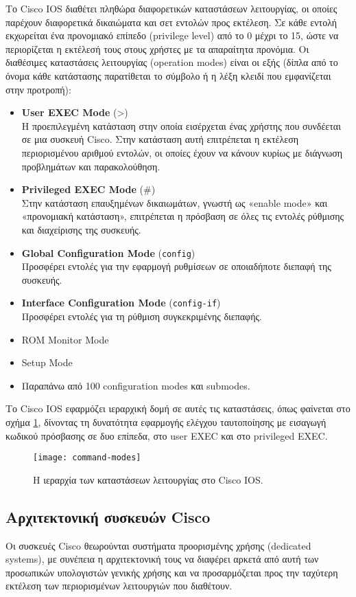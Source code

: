 \documentclass{EdipyLabs} %
\begin{document}
Το Cisco IOS διαθέτει πληθώρα διαφορετικών καταστάσεων λειτουργίας, οι οποίες παρέχουν διαφορετικά δικαιώματα και σετ εντολών προς εκτέλεση. Σε κάθε εντολή εκχωρείται ένα προνομιακό επίπεδο (privilege level) από το 0 μέχρι το 15, ώστε να περιορίζεται η εκτέλεσή τους στους χρήστες με τα απαραίτητα προνόμια. Οι διαθέσιμες καταστάσεις λειτουργίας (operation modes) είναι οι εξής (δίπλα από το όνομα κάθε κατάστασης παρατίθεται το σύμβολο ή η λέξη κλειδί που εμφανίζεται στην προτροπή):
\begin{itemize}
	\item \textbf{User EXEC Mode} (>)\\
	H προεπιλεγμένη κατάσταση στην οποία εισέρχεται ένας χρήστης που συνδέεται σε μια συσκευή Cisco. Στην κατάσταση αυτή επιτρέπεται η εκτέλεση περιορισμένου αριθμού εντολών, οι οποίες έχουν να κάνουν κυρίως με διάγνωση προβλημάτων και παρακολούθηση. 
	\item \textbf{Privileged EXEC Mode} (\#)\\
	Στην κατάσταση επαυξημένων δικαιωμάτων, γνωστή ως «enable mode» και «προνομιακή κατάσταση», επιτρέπεται η πρόσβαση σε όλες τις εντολές ρύθμισης και διαχείρισης της συσκευής.
	\item \textbf{Global Configuration Mode} (\texttt{config})\\
	Προσφέρει εντολές για την εφαρμογή ρυθμίσεων σε οποιαδήποτε διεπαφή της συσκευής.
	\item \textbf{Interface Configuration Mode} (\texttt{config-if})\\
	Προσφέρει εντολές για τη ρύθμιση συγκεκριμένης διεπαφής.
	\item ROM Monitor Mode
	\item Setup Mode
	\item Παραπάνω από 100 configuration modes και submodes.
\end{itemize}
Το Cisco IOS εφαρμόζει ιεραρχική δομή σε αυτές τις καταστάσεις, όπως φαίνεται στο σχήμα \ref{fig:command-modes}, δίνοντας τη δυνατότητα εφαρμογής ελέγχου ταυτοποίησης με εισαγωγή κωδικού πρόσβασης σε δυο επίπεδα, στο user EXEC και στο privileged EXEC.

\begin{figure}[ht]
	\centering
	\texttt{[image: command-modes]}
	\caption{Η ιεραρχία των καταστάσεων λειτουργίας στο Cisco IOS.}\label{fig:command-modes}
\end{figure}
\newpage
\subsection{Αρχιτεκτονική συσκευών Cisco}
Οι συσκευές Cisco θεωρούνται συστήματα προορισμένης χρήσης (dedicated systems), με συνέπεια η αρχιτεκτονική τους να διαφέρει αρκετά από αυτή των προσωπικών υπολογιστών γενικής χρήσης και να προσαρμόζεται προς την ταχύτερη εκτέλεση των περιορισμένων λειτουργιών που διαθέτουν.
\end{document}
